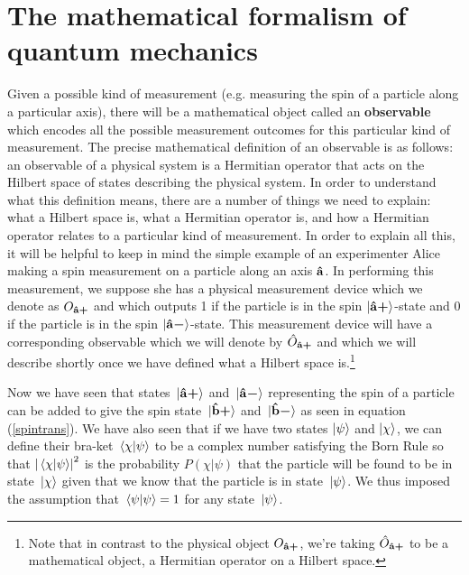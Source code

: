 \section{The mathematical formalism of quantum mechanics}
Given a possible kind of measurement (e.g. measuring the spin of a particle along a particular axis), there will be a mathematical object called an \textbf{observable} which encodes all the possible measurement outcomes for this particular kind of measurement. The precise mathematical definition of an observable is as follows: an observable of a physical system is a Hermitian operator that acts on the Hilbert space of states describing the physical system. In order to understand what this definition means, there are a number of things we need to explain: what a Hilbert space is, what a Hermitian operator is, and how a Hermitian operator relates to a particular kind of measurement. In order to explain all this, it will be helpful to keep in mind the simple example of an experimenter Alice making a spin measurement on a particle along an axis $\vb{\hat{{a}}}$. In performing this measurement, we suppose she has a physical measurement device which we denote as $O_{\vb{\hat{{a}}}\bm{+}}$ and which outputs 1 if the particle is in the spin $\ket{\vb{\hat{{a}}}\bm{+}}$-state and 0 if the particle is in the spin $\ket{\vb{\hat{{a}}}\bm{-}}$-state. This measurement device will have a corresponding observable which we will denote by $\hat{O}_{\vb{\hat{{a}}}\bm{+}}$ and which we will describe shortly once we have defined what a Hilbert space is.\footnote{Note that in contrast to the physical object $O_{\vb{\hat{{a}}}\bm{+}}$, we're taking $\hat{O}_{\vb{\hat{{a}}}\bm{+}}$ to be a mathematical object, a Hermitian operator on a Hilbert space.} 

Now we have seen that states $\ket*{\vb{\hat{{a}}}\bm{+}}$ and $\ket*{\vb{\hat{{a}}}\bm{-}}$ representing the spin of  a particle can be added to give the spin state $\ket*{\vb{\hat{{b}}}\bm{+}}$ and $\ket*{\vb{\hat{{b}}}\bm{-}}$ as seen in equation (\ref{spintrans}). We have also seen that if we have two states $\ket{\psi}$ and $\ket{\chi}$, we can define their bra-ket $\ip*{\chi}{\psi}$ to be a complex number satisfying the Born Rule so that $\abs{\ip*{\chi}{\psi}}^2$ is the probability $P(\chi|\psi)$ that the particle will be found to be in state $\ket*{\chi}$ given that we know that the particle is in state $\ket*{\psi}$. We thus imposed the assumption that  $\ip*{\psi}{\psi}=1$ for any state $\ket*{\psi}$. 

